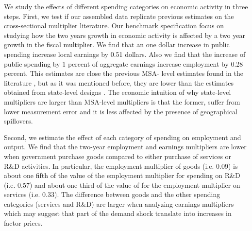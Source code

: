 \documentclass[dv_diss_main.tex]{subfiles}
\begin{document}
We study the effects of different spending categories on economic activity in three steps. First, we test if our assembled data replicate previous estimates on the cross-sectional multiplier literature. Our benchmark specification focus on studying how the two years growth in economic activity is affected by a two year growth in the fiscal multiplier. We find that an one dollar increase in public spending increase local earnings by 0.51 dollars. Also we find that the increase of public spending by 1 percent of aggregate earnings increase employment by 0.28 percent. This estimates are close the previous MSA- level estimates found in the literature \citep{Auerbach2019, Demyanyk2019}, but as it was mentioned before, they are lower than the estimates obtained from state-level designs \citep{Nakamura2014}. The economic intuition of why state-level multipliers are larger than MSA-level multipliers is that the former, suffer from lower measurement error and it is less affected by the presence of geographical spillovers. 


Second, we estimate the effect of each category of spending on employment and output. We find that the two-year employment and earnings multipliers are lower when government purchase goods compared to either purchase of services or R\&D activities. In particular, the employment multiplier of goods (i.e. 0.09) is about one fifth of the value of the employment multiplier for spending on R\&D (i.e. 0.57) and about one third of the value of for the employment multiplier on services (i.e. 0.33). The difference between goods and the other spending categories (services and R&D) are larger when analyzing earnings multipliers which may suggest that part of the demand shock translate into increases in factor prices.   
\end{document}
